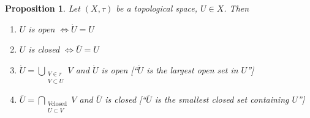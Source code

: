 \documentclass{article}
\newcounter{lecref}[section]
\numberwithin{lecref}{section}
\newtheorem{proposition}[lecref]{Proposition}
\begin{document}
\begin{proposition}
	\label{proposition:1.6}
	Let $(X, \tau)$ be a topological space, $U \in X$. Then
	\begin{enumerate}
		\item $U$ is open $\iff \mathring U = U$
		\item $U$ is closed $\iff \overline U = U$
		\item $\mathring U = \bigcup_{\substack{V \in \tau \\ V \subset U}} V$ and $\mathring U$ is open [\enquote{$\mathring U$ is the largest open set in $U$}]
		\item $\overline U = \bigcap_{\substack{V \text{closed} \\ U \subset V}} V$ and $\overline U$ is closed [\enquote{$\overline U$ is the smallest closed set containing $U$}]
	\end{enumerate}
\end{proposition}
\end{document}
